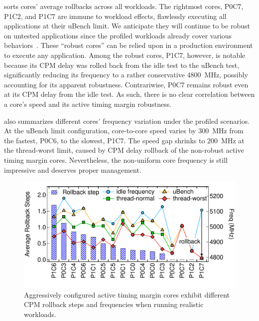  sorts cores' average rollbacks across all workloads. The rightmost cores, P0C7, P1C2, and P1C7 are immune to workload effects, flawlessly executing all applications at their uBench limit. We anticipate they will continue to be robust on untested applications since the profiled workloads already cover various behaviors~\cite{song2018spec}. These ``robust cores'' can be relied upon in a production environment to execute any application. Among the robust cores, P1C7, however, is notable because its CPM delay was rolled back from the idle test to the uBench test, significantly reducing its frequency to a rather conservative 4800~MHz, possibly accounting for its apparent robustness. Contrariwise, P0C7 remains robust even at its CPM delay from the idle test. As such, there is no clear correlation between a core's speed and its active timing margin robustness. 


 also summarizes different cores' frequency variation under the profiled scenarios. At the uBench limit configuration, core-to-core speed varies by 300~MHz from the fastest, P0C6, to the slowest, P1C7. The speed gap shrinks to 200~MHz at the thread-worst limit, caused by CPM delay rollback of the non-robust active timing margin cores. Nevertheless, the non-uniform core frequency is still impressive and deserves proper management.

\begin{figure}[t]
  \centering
  \includegraphics[trim=0 20 0 20,clip,width=\linewidth]{graphs/process//spec-rollback.pdf}
  \caption{Aggressively configured active timing margin cores exhibit different CPM rollback steps and frequencies when running realistic workloads.}
  \label{fig:core-cpm-var}
\end{figure}


